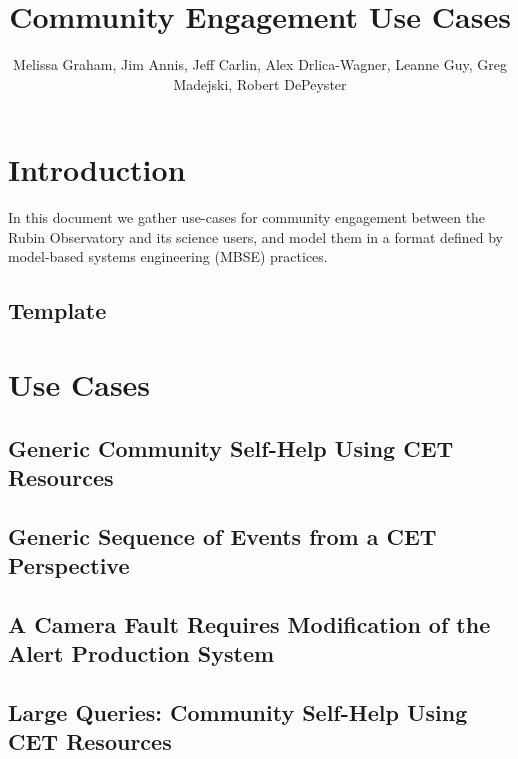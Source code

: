 \documentclass[DM,lsstdraft,authoryear,toc]{lsstdoc}
\title{Community Engagement Use Cases}
\author{%
Melissa Graham,  Jim Annis, Jeff Carlin, Alex Drlica-Wagner, Leanne Guy, Greg Madejski, Robert DePeyster
}
\date{\vcsDate}
\begin{document}
\maketitle


\section{Introduction}

In this document we gather use-cases for community engagement between the Rubin Observatory and its science users, and model them in a format defined by model-based systems engineering (MBSE) practices.

\clearpage
\subsection{Template}


\clearpage
\section{Use Cases}

\clearpage
\subsection{Generic Community Self-Help Using CET Resources}


\clearpage
\subsection{Generic Sequence of Events from a CET Perspective}


\clearpage
\subsection{A Camera Fault Requires Modification of the Alert Production System}


\clearpage
\subsection{Large Queries: Community Self-Help Using CET Resources}
\end{document}
